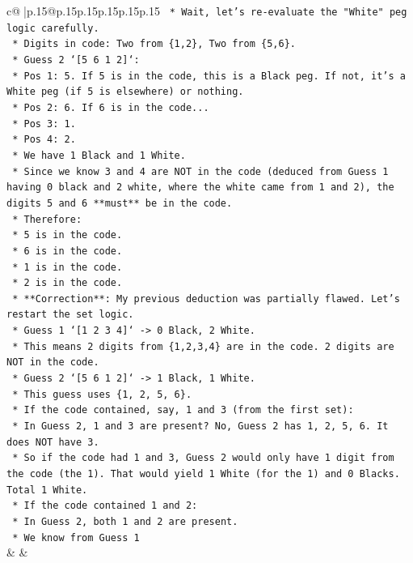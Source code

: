 \documentclass{article}
\begin{document}
{\begin{supertabular}{c@{$\;$}|p{.15\linewidth}@{}p{.15\linewidth}p{.15\linewidth}p{.15\linewidth}p{.15\linewidth}p{.15\linewidth}}
{{{\texttt{        *   Wait, let's re{-}evaluate the "White" peg logic carefully.} \\
\texttt{        *   Digits in code: Two from \{1,2\}, Two from \{5,6\}.} \\
\texttt{        *   Guess 2 `{[}5 6 1 2{]}`:} \\
\texttt{            *   Pos 1: 5. If 5 is in the code, this is a Black peg. If not, it's a White peg (if 5 is elsewhere) or nothing.} \\
\texttt{            *   Pos 2: 6. If 6 is in the code...} \\
\texttt{            *   Pos 3: 1.} \\
\texttt{            *   Pos 4: 2.} \\
\texttt{        *   We have 1 Black and 1 White.} \\
\texttt{        *   Since we know 3 and 4 are NOT in the code (deduced from Guess 1 having 0 black and 2 white, where the white came from 1 and 2), the digits 5 and 6 **must** be in the code.} \\
\texttt{        *   Therefore:} \\
\texttt{            *   5 is in the code.} \\
\texttt{            *   6 is in the code.} \\
\texttt{            *   1 is in the code.} \\
\texttt{            *   2 is in the code.} \\
\texttt{        *   **Correction**: My previous deduction was partially flawed. Let's restart the set logic.} \\
\texttt{        *   Guess 1 `{[}1 2 3 4{]}` {-}> 0 Black, 2 White.} \\
\texttt{            *   This means 2 digits from \{1,2,3,4\} are in the code. 2 digits are NOT in the code.} \\
\texttt{        *   Guess 2 `{[}5 6 1 2{]}` {-}> 1 Black, 1 White.} \\
\texttt{            *   This guess uses \{1, 2, 5, 6\}.} \\
\texttt{            *   If the code contained, say, 1 and 3 (from the first set):} \\
\texttt{                *   In Guess 2, 1 and 3 are present? No, Guess 2 has 1, 2, 5, 6. It does NOT have 3.} \\
\texttt{                *   So if the code had 1 and 3, Guess 2 would only have 1 digit from the code (the 1). That would yield 1 White (for the 1) and 0 Blacks. Total 1 White.} \\
\texttt{            *   If the code contained 1 and 2:} \\
\texttt{                *   In Guess 2, both 1 and 2 are present.} \\
\texttt{                *   We know from Guess 1} \\
            }
        }
    }
    & & \\ \\


\end{supertabular}}
\end{document}
